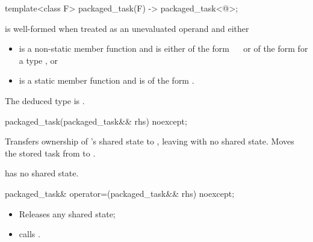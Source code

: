 %
\begin{itemdecl}
template<class F> packaged_task(F) -> packaged_task<@\seebelow@>;
\end{itemdecl}

\begin{itemdescr}
\pnum
\constraints
{} is well-formed when
treated as an unevaluated operand and either
\begin{itemize}
\item
{} is a non-static member function and
 is either of the form
~\cv{}~
or of the form
for a type , or
\item
{} is a static member function and
 is of the form
.
\end{itemize}

\pnum
\remarks
The deduced type is .
\end{itemdescr}

%
\begin{itemdecl}
packaged_task(packaged_task&& rhs) noexcept;
\end{itemdecl}

\begin{itemdescr}
\pnum
\effects
Transfers ownership of
's shared state to , leaving  with no
shared state. Moves the stored task from  to .

\pnum
\ensures
{} has no shared state.
\end{itemdescr}

%
\begin{itemdecl}
packaged_task& operator=(packaged_task&& rhs) noexcept;
\end{itemdecl}

\begin{itemdescr}
\pnum
\effects
\begin{itemize}
\item
Releases any shared state;
\item
calls .
\end{itemize}
\end{itemdescr}

